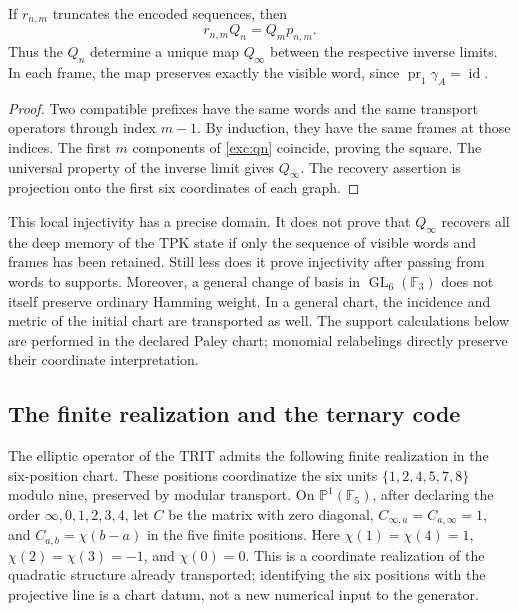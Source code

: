 \begin{proposition}
\label{exc:limite-inverso}
If $r_{n,m}$ truncates the encoded sequences, then
\[
 r_{n,m}Q_n=Q_m p_{n,m}.
\]
Thus the $Q_n$ determine a unique map $Q_\infty$ between the
respective inverse limits. In each frame, the map preserves exactly
the visible word, since $\operatorname{pr}_1\gamma_A=\operatorname{id}$.
\end{proposition}

\begin{proof}
Two compatible prefixes have the same words and the same
transport operators through index $m-1$. By induction, they have
the same frames at those indices. The first $m$ components of
\eqref{exc:qn} coincide, proving the square. The universal
property of the inverse limit gives $Q_\infty$. The recovery assertion
is projection onto the first six coordinates of each graph.
\end{proof}

This local injectivity has a precise domain. It does not prove that
$Q_\infty$ recovers all the deep memory of the TPK state if only
the sequence of visible words and frames has been retained. Still less
does it prove injectivity after passing from words to supports.
Moreover, a general change of basis in $\operatorname{GL}_6(\mathbb F_3)$
does not itself preserve ordinary Hamming weight. In a general
chart, the incidence and metric of the initial chart are
transported as well. The support calculations below are performed in the
declared Paley chart; monomial relabelings directly preserve their
coordinate interpretation.

\subsection{The finite realization and the ternary code}
\label{exc:paley-codigo}

The elliptic operator of the TRIT admits the following finite realization in
the six-position chart. These positions coordinatize the six units
$\{1,2,4,5,7,8\}$ modulo nine, preserved by modular transport.
On $\mathbb P^1(\mathbb F_5)$, after
declaring the order $\infty,0,1,2,3,4$, let $C$ be the matrix with
zero diagonal, $C_{\infty,a}=C_{a,\infty}=1$, and
$C_{a,b}=\chi(b-a)$ in the five finite positions. Here
$\chi(1)=\chi(4)=1$, $\chi(2)=\chi(3)=-1$, and $\chi(0)=0$.
This is a coordinate realization of the quadratic structure already
transported; identifying the six positions with the projective
line is a chart datum, not a new numerical input to the
generator.

